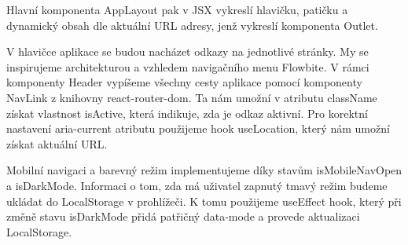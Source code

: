 Hlavní komponenta AppLayout pak v JSX vykreslí hlavičku, patičku a dynamický obsah dle aktuální URL adresy, jenž vykreslí komponenta Outlet.

V hlavičce aplikace se budou nacházet odkazy na jednotlivé stránky. My se inspirujeme architekturou a vzhledem navigačního menu Flowbite. 
V rámci komponenty Header vypíšeme všechny cesty aplikace pomocí komponenty NavLink z knihovny react-router-dom. Ta nám umožní v atributu className získat vlastnost isActive, která indikuje, zda je odkaz aktivní. 
Pro korektní nastavení aria-current atributu použijeme hook useLocation, který nám umožní získat aktuální URL.

Mobilní navigaci a barevný režim implementujeme díky stavům isMobileNavOpen a isDarkMode. Informaci o tom, zda má uživatel zapnutý tmavý režim budeme ukládat do LocalStorage v prohlížeči. 
K tomu použijeme useEffect hook, který při změně stavu isDarkMode přidá patřičný data-mode a provede aktualizaci LocalStorage.